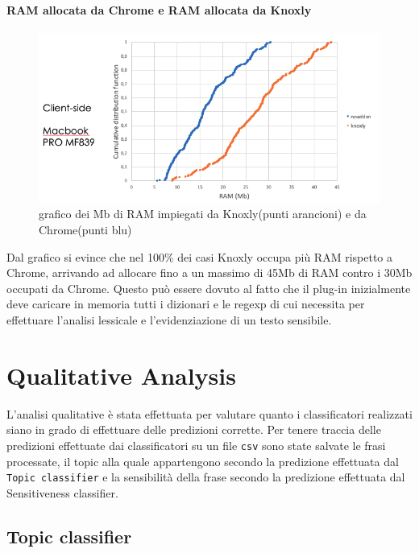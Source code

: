 \paragraph{RAM allocata da Chrome e RAM allocata da Knoxly}
\begin{figure}[h!t]
    \centering
    \includegraphics[width=15cm]{Figure/quantitativa/RAM-client.png}
    \caption{grafico dei Mb di RAM impiegati da Knoxly(punti arancioni) e da Chrome(punti blu)}
    \label{fig:clientRAM}
\end{figure}
\FloatBarrier
Dal grafico si evince che nel 100\% dei casi Knoxly occupa più RAM rispetto a Chrome, arrivando ad allocare fino a un massimo di 45Mb di RAM contro i 30Mb occupati da Chrome. Questo può essere dovuto al fatto che il plug-in inizialmente deve caricare in memoria tutti i dizionari e le regexp di cui necessita per effettuare l'analisi lessicale e l'evidenziazione di un testo sensibile.



\section{Qualitative Analysis}
\label{sec:qualitative}
L'analisi qualitative è stata effettuata per valutare quanto i classificatori realizzati siano in grado di effettuare delle predizioni corrette. Per tenere traccia delle predizioni effettuate dai classificatori su un file {\tt csv} sono state salvate le frasi processate, il topic alla quale appartengono secondo la predizione effettuata dal {\tt Topic classifier} e la sensibilità della frase secondo la predizione effettuata dal {\\ Sensitiveness classifier}.

\subsection{Topic classifier}
\label{sec:qualTopic}

